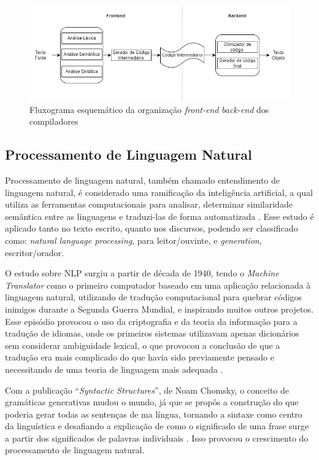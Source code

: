\documentclass[12pt]{article}
\begin{document}
\begin{figure}[ht]
    \centering
    \includegraphics[scale=0.5]{Imagens/modelos_organizacionais_compiladores_front_back.drawio.png}
    \caption{Fluxograma esquemático da organização \textit{front-end} \textit{back-end} dos compiladores}
    \label{fig:modelo_front_back}
\end{figure}

\subsection{Processamento de Linguagem Natural}
Processamento de linguagem natural, também chamado entendimento de linguagem natural, é considerado uma ramificação da inteligência artificial, a qual utiliza as ferramentas computacionais para analisar, determinar similaridade semântica entre as linguagens e traduzi-las de forma automatizada \cite{NLP_book} \cite{NLP_ml_and_protein}. Esse estudo é aplicado tanto no texto escrito, quanto nos discursos, podendo ser classificado como: \textit{natural language processing}, para leitor/ouvinte, e \textit{generation}, escritor/orador.

O estudo sobre NLP surgiu a partir de década de 1940, tendo o \textit{Machine Translator} como o primeiro computador baseado em uma aplicação relacionada à linguagem natural, utilizando de tradução computacional para quebrar códigos inimigos durante a Segunda Guerra Mundial, e inspirando muitos outros projetos. Esse episódio provocou o uso da criptografia e da teoria da informação para a tradução de idiomas, onde os primeiros sistemas utilizavam apenas dicionários sem considerar ambiguidade lexical, o que provocou a conclusão de que a tradução era mais complicado do que havia sido previamente pensado e necessitando de uma teoria de linguagem mais adequada \cite{liddy2001natural}.

Com a publicação “\textit{Syntactic Structures}”, de Noam Chomsky, o conceito de gramáticas generativas mudou o mundo, já que se propôs a construção do que poderia gerar todas as sentenças de ma língua, tornando a sintaxe como centro da linguística e desafiando a explicação de como o significado de uma frase surge a partir dos significados de palavras individuais \cite{NLP_book}. Isso provocou o crescimento do processamento de linguagem natural.
\end{document}
